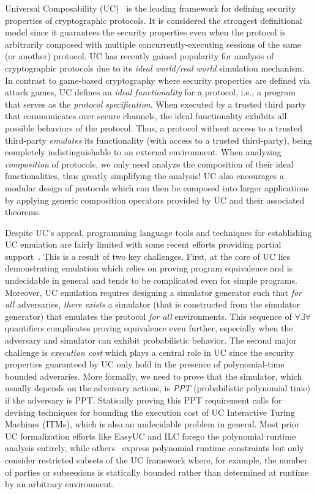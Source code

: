 Universal Composability (UC)~\cite{canettiUC} is the leading framework for defining security properties of cryptographic protocols.
It is considered the strongest definitional model since it guarantees the security properties even when the protocol is arbitrarily composed with
multiple concurrently-executing sessions of the same (or another) protocol.
UC has recently gained popularity for analysis of cryptographic protocols due to its \emph{ideal world/real world} simulation mechanism.
In contrast to game-based cryptography where security properties are defined via attack games,
UC defines an \emph{ideal functionality} for a protocol, i.e., a program that serves as the \emph{protocol specification}.
When executed by a trusted third party that communicates over secure channels, the ideal functionality exhibits all possible behaviors of the protocol.
Thus, a protocol without access to a trusted third-party \emph{emulates} its functionality (with access to a trusted third-party),
being completely indistinguishable to an external environment.
When analyzing \emph{composition} of protocols, we only need analyze the composition of their ideal functionalities, thus greatly
simplifying the analysis!
UC also encourages a modular design of protocols which can then be composed into larger applications by applying generic composition operators
provided by UC and their associated theorems.

Despite UC's appeal, programming language tools and techniques for establishing UC emulation are fairly limited with some recent efforts providing
partial support~\cite{ilc,easyuc,ipdl,symbolicuc,barbosa}. This is a result of two key challenges.
First, at the core of UC lies demonstrating emulation which relies on proving program equivalence and is undecidable in general
and tends to be complicated even for simple programs.
Moreover, UC emulation requires designing a simulator generator such that \emph{for all} adversaries, \emph{there exists} a simulator (that is constructed
from the simulator generator) that emulates the protocol \emph{for all} environments.
This sequence of $\forall \exists \forall$ quantifiers complicates proving equivalence even further, especially when the adversary and simulator can exhibit
probabilistic behavior.
The second major challenge is \emph{execution cost} which plays a central role in UC since the security properties
guaranteed by UC only hold in the presence of polynomial-time bounded adveraries.
More formally, we need to prove that the simulator, which usually depends on the adversary actions, is \emph{PPT} (probabilistic polynomial time)
if the adversary is PPT.
Statically proving this PPT requirement calls for devising techniques for bounding the execution cost of UC Interactive Turing Machines (ITMs),
which is also an undecidable problem in general.
Most prior UC formalization efforts like EasyUC and ILC forego the polynomial runtime analysis entirely, while others~\cite{ipdl,barbosa,ilc}
express polynomial runtime constraints but only consider restricted subsets of the UC framework where, for example, the number of parties
or subsessions is statically bounded rather than determined at runtime by an arbitrary environment.

